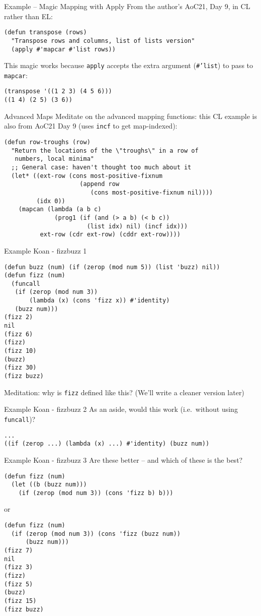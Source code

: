 \documentclass[presentation]{beamer}
\begin{document}
\begin{frame}[fragile]{Example -- Magic Mapping with Apply}
From the author's AoC21, Day 9, in CL rather than EL:
\begin{verbatim}
(defun transpose (rows)
  "Transpose rows and columns, list of lists version"
  (apply #'mapcar #'list rows))
\end{verbatim}
This magic works because \texttt{apply} accepts the extra argument (\texttt{\#'list}) to pass to \texttt{mapcar}:
\begin{verbatim}
(transpose '((1 2 3) (4 5 6)))
((1 4) (2 5) (3 6))
\end{verbatim}
\end{frame}
\begin{frame}[fragile]{Advanced Maps}
  Meditate on the advanced mapping functions: this CL example is also from AoC21 Day 9 (uses \texttt{incf} to get map-indexed):
\begin{verbatim}
(defun row-troughs (row)
  "Return the locations of the \"troughs\" in a row of
   numbers, local minima"
  ;; General case: haven't thought too much about it
  (let* ((ext-row (cons most-positive-fixnum
                     (append row
                        (cons most-positive-fixnum nil))))
         (idx 0))
    (mapcan (lambda (a b c)
              (prog1 (if (and (> a b) (< b c))
                       (list idx) nil) (incf idx)))
          ext-row (cdr ext-row) (cddr ext-row))))
\end{verbatim}
\end{frame}
\begin{frame}[fragile]{Example Koan - fizzbuzz 1}
\begin{verbatim}
(defun buzz (num) (if (zerop (mod num 5)) (list 'buzz) nil))
(defun fizz (num)
  (funcall
   (if (zerop (mod num 3))
       (lambda (x) (cons 'fizz x)) #'identity)
   (buzz num)))
(fizz 2)
nil
(fizz 6)
(fizz)
(fizz 10)
(buzz)
(fizz 30)
(fizz buzz)
\end{verbatim}
Meditation: why is \texttt{fizz} defined like this?  (We'll write a cleaner version later)
\end{frame}
\begin{frame}[fragile]{Example Koan - fizzbuzz 2}
As an aside, would this work (i.e.\ without using \texttt{funcall})?
\begin{verbatim}
...
((if (zerop ...) (lambda (x) ...) #'identity) (buzz num))
\end{verbatim}

\end{frame}
\begin{frame}[fragile]{Example Koan - fizzbuzz 3}
Are these better -- and which of these is the best?
\begin{verbatim}
(defun fizz (num)
  (let ((b (buzz num)))
    (if (zerop (mod num 3)) (cons 'fizz b) b)))
\end{verbatim}
or
\begin{verbatim}
(defun fizz (num)
  (if (zerop (mod num 3)) (cons 'fizz (buzz num))
      (buzz num)))
(fizz 7)
nil
(fizz 3)
(fizz)
(fizz 5)
(buzz)
(fizz 15)
(fizz buzz)
\end{verbatim}

\end{frame}
\end{document}
